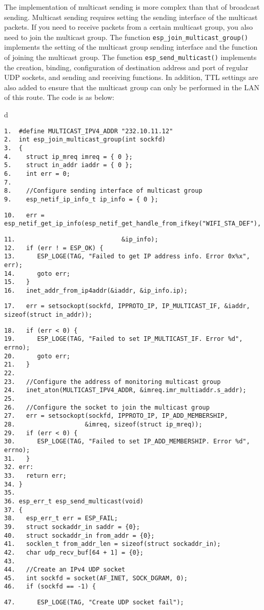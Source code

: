 \documentclass[a4paper,12pt]{book}
\begin{document}
The implementation of multicast sending is more complex than that of broadcast sending. Multicast sending requires setting the sending interface of the multicast packets. If you need to receive packets from a certain multicast group, you also need to join the multicast group. The function \verb|esp_join_multicast_group()| implements the setting of the multicast group sending interface and the function of joining the multicast group. The function \verb|esp_send_multicast()| implements the creation, binding, configuration of destination address and port of regular UDP sockets, and sending and receiving functions. In addition, TTL settings are also added to ensure that the multicast group can only be performed in the LAN of this route. The code is as below:

\begin{codebloc}
\begin{tabular}{d}
\vspace{2pt}
\begin{verbatim}
1.  #define MULTICAST_IPV4_ADDR "232.10.11.12"
2.  int esp_join_multicast_group(int sockfd)
3.  {
4.    struct ip_mreq imreq = { 0 };
5.    struct in_addr iaddr = { 0 };
6.    int err = 0;  
7.	
8.    //Configure sending interface of multicast group
9.    esp_netif_ip_info_t ip_info = { 0 };
\end{verbatim}
\verb|10.   |\fontsize{9.5pt}{10pt}\selectfont\verb|err = esp_netif_get_ip_info(esp_netif_get_handle_from_ifkey("WIFI_STA_DEF"),|
\footnotesize
\begin{verbatim}
11.                             &ip_info);
12.   if (err ! = ESP_OK) {
13.      ESP_LOGE(TAG, "Failed to get IP address info. Error 0x%x", err);
14.      goto err;
15.   }
16.   inet_addr_from_ip4addr(&iaddr, &ip_info.ip);
\end{verbatim}
\verb|17.   |\fontsize{8.5pt}{10pt}\selectfont\verb|err = setsockopt(sockfd, IPPROTO_IP, IP_MULTICAST_IF, &iaddr, sizeof(struct in_addr));|
\footnotesize
\begin{verbatim}
18.   if (err < 0) {
19.      ESP_LOGE(TAG, "Failed to set IP_MULTICAST_IF. Error %d", errno);
20.      goto err;
21.   }
22. 	 
23.   //Configure the address of monitoring multicast group
24.   inet_aton(MULTICAST_IPV4_ADDR, &imreq.imr_multiaddr.s_addr);
25.	
26.   //Configure the socket to join the multicast group
27.   err = setsockopt(sockfd, IPPROTO_IP, IP_ADD_MEMBERSHIP,
28.                   &imreq, sizeof(struct ip_mreq));
29.   if (err < 0) {
30.      ESP_LOGE(TAG, "Failed to set IP_ADD_MEMBERSHIP. Error %d", errno);
31.   }
32.	err:
33.   return err;
34.	}
35.	
36.	esp_err_t esp_send_multicast(void)
37.	{
38.   esp_err_t err = ESP_FAIL;
39.   struct sockaddr_in saddr = {0};
40.   struct sockaddr_in from_addr = {0};
41.   socklen_t from_addr_len = sizeof(struct sockaddr_in);
42.   char udp_recv_buf[64 + 1] = {0};
43.	
44.   //Create an IPv4 UDP socket
45.   int sockfd = socket(AF_INET, SOCK_DGRAM, 0);
46.   if (sockfd == -1) {
\end{verbatim}
\verb|47.      ESP_LOGE(TAG, "Create UDP socket fail");|
\end{tabular}
\end{codebloc}
\end{document}
